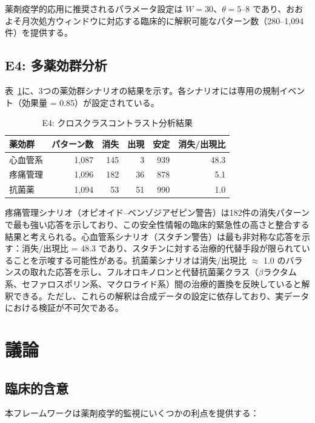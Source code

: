 \documentclass[11pt]{article}
\begin{document}
薬剤疫学的応用に推奨されるパラメータ設定は $W = 30$、$\theta = 5$--$8$ であり、おおよそ月次処方ウィンドウに対応する臨床的に解釈可能なパターン数（280--1{,}094件）を提供する。

\subsection{E4: 多薬効群分析}

表~\ref{tab:e4}に、3つの薬効群シナリオの結果を示す。各シナリオには専用の規制イベント（効果量 = 0.85）が設定されている。

\begin{table}[htbp]
\centering
\caption{E4: クロスクラスコントラスト分析結果}
\label{tab:e4}
\begin{tabular}{@{}lrrrrr@{}}
\toprule
薬効群 & パターン数 & 消失 & 出現 & 安定 & 消失/出現比 \\
\midrule
心血管系 & 1{,}087 & 145 & 3 & 939 & 48.3 \\
疼痛管理 & 1{,}096 & 182 & 36 & 878 & 5.1 \\
抗菌薬 & 1{,}094 & 53 & 51 & 990 & 1.0 \\
\bottomrule
\end{tabular}
\end{table}

疼痛管理シナリオ（オピオイド--ベンゾジアゼピン警告）は182件の消失パターンで最も強い応答を示しており、この安全性情報の臨床的緊急性の高さと整合する結果と考えられる。心血管系シナリオ（スタチン警告）は最も非対称な応答を示す：消失/出現比 = 48.3 であり、スタチンに対する治療的代替手段が限られていることを示唆する可能性がある。抗菌薬シナリオは消失/出現比 $\approx$ 1.0 のバランスの取れた応答を示し、フルオロキノロンと代替抗菌薬クラス（$\beta$ラクタム系、セファロスポリン系、マクロライド系）間の治療的置換を反映していると解釈できる。ただし、これらの解釈は合成データの設定に依存しており、実データにおける検証が不可欠である。

\section{議論}\label{sec:discussion}

\subsection{臨床的含意}

本フレームワークは薬剤疫学的監視にいくつかの利点を提供する：
\end{document}
